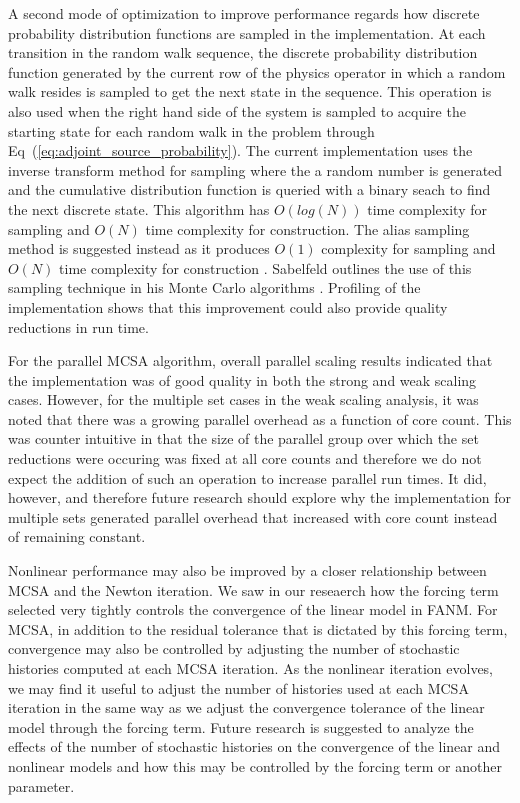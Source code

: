 A second mode of optimization to improve performance regards how
discrete probability distribution functions are sampled in the
implementation. At each transition in the random walk sequence, the
discrete probability distribution function generated by the current
row of the physics operator in which a random walk resides is sampled
to get the next state in the sequence. This operation is also used
when the right hand side of the system is sampled to acquire the
starting state for each random walk in the problem through
Eq~(\ref{eq:adjoint_source_probability}). The current implementation
uses the inverse transform method for sampling where the a random
number is generated and the cumulative distribution function is
queried with a binary seach to find the next discrete state. This
algorithm has $O(log(N))$ time complexity for sampling and $O(N)$ time
complexity for construction. The alias sampling method is suggested
instead as it produces $O(1)$ complexity for sampling and $O(N)$ time
complexity for construction \cite{smith_analysis_2005}. Sabelfeld
outlines the use of this sampling technique in his Monte Carlo
algorithms \cite{sabelfeld_sparsified_2009}. Profiling of the
implementation shows that this improvement could also provide quality
reductions in run time.

For the parallel MCSA algorithm, overall parallel scaling results
indicated that the implementation was of good quality in both the
strong and weak scaling cases. However, for the multiple set cases in
the weak scaling analysis, it was noted that there was a growing
parallel overhead as a function of core count. This was counter
intuitive in that the size of the parallel group over which the set
reductions were occuring was fixed at all core counts and therefore we
do not expect the addition of such an operation to increase parallel
run times. It did, however, and therefore future research should
explore why the implementation for multiple sets generated parallel
overhead that increased with core count instead of remaining constant.

Nonlinear performance may also be improved by a closer relationship
between MCSA and the Newton iteration. We saw in our reseaerch how the
forcing term selected very tightly controls the convergence of the
linear model in FANM. For MCSA, in addition to the residual tolerance
that is dictated by this forcing term, convergence may also be
controlled by adjusting the number of stochastic histories computed at
each MCSA iteration. As the nonlinear iteration evolves, we may find
it useful to adjust the number of histories used at each MCSA
iteration in the same way as we adjust the convergence tolerance of
the linear model through the forcing term. Future research is
suggested to analyze the effects of the number of stochastic histories
on the convergence of the linear and nonlinear models and how this may
be controlled by the forcing term or another parameter.

